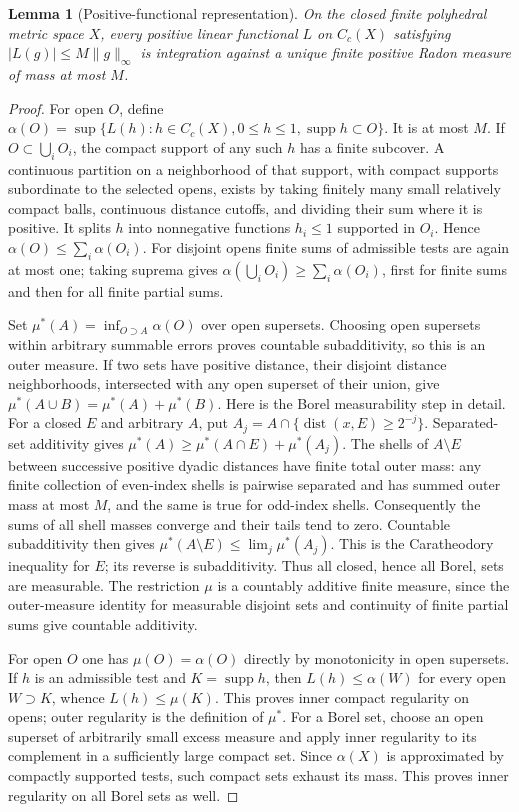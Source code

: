 \documentclass[11pt]{article}
\newtheorem{lemma}[theorem]{Lemma}
\begin{document}
\begin{lemma}[Positive-functional representation]\label{radon-lemma}
On the closed finite polyhedral metric space $X$, every positive linear
functional $L$ on $C_c(X)$ satisfying $|L(g)|\leq M\|g\|_\infty$ is
integration against a unique finite positive Radon measure of mass at
most $M$.
\end{lemma}
\begin{proof}
For open $O$, define
$\alpha(O)=\sup\{L(h):h\in C_c(X),0\leq h\leq1,
\operatorname{supp}h\subset O\}$.
It is at most $M$. If $O\subset\bigcup_iO_i$, the compact support of
any such $h$ has a finite subcover. A continuous partition on a neighborhood
of that support, with compact supports subordinate to the selected opens,
exists by taking finitely many small relatively compact balls, continuous
distance cutoffs, and dividing their sum where it is positive. It splits
$h$ into nonnegative functions $h_i\leq1$ supported in $O_i$.
Hence $\alpha(O)\leq\sum_i\alpha(O_i)$. For disjoint opens finite
sums of admissible tests are again at most one; taking suprema gives
$\alpha(\bigcup_iO_i)\geq\sum_i\alpha(O_i)$, first for finite sums
and then for all finite partial sums.

Set $\mu^*(A)=\inf_{O\supset A}\alpha(O)$ over open supersets.
Choosing open supersets within arbitrary summable errors proves countable
subadditivity, so this is an outer measure. If two sets have positive
distance, their disjoint distance neighborhoods, intersected with any
open superset of their union, give
$\mu^*(A\cup B)=\mu^*(A)+\mu^*(B)$.
Here is the Borel measurability step in detail. For a closed $E$ and
arbitrary $A$, put $A_j=A\cap\{\operatorname{dist}(x,E)\geq2^{-j}\}$.
Separated-set additivity gives
$\mu^*(A)\geq\mu^*(A\cap E)+\mu^*(A_j)$.
The shells of $A\setminus E$ between successive positive dyadic distances
have finite total outer mass: any finite collection of even-index shells
is pairwise separated and has summed outer mass at most $M$, and the
same is true for odd-index shells. Consequently the sums of all shell
masses converge and their tails tend to zero. Countable subadditivity
then gives
$\mu^*(A\setminus E)\leq\lim_j\mu^*(A_j)$.
This is the Caratheodory inequality for $E$; its reverse is subadditivity.
Thus all closed, hence all Borel, sets are measurable. The restriction
$\mu$ is a countably additive finite measure, since the outer-measure
identity for measurable disjoint sets and continuity of finite partial
sums give countable additivity.

For open $O$ one has $\mu(O)=\alpha(O)$ directly by monotonicity in
open supersets. If $h$ is an admissible test and $K=\operatorname{supp}h$,
then $L(h)\leq\alpha(W)$ for every open $W\supset K$, whence
$L(h)\leq\mu(K)$. This proves inner compact regularity on opens;
outer regularity is the definition of $\mu^*$. For a Borel set, choose
an open superset of arbitrarily small excess measure and apply inner
regularity to its complement in a sufficiently large compact set.
Since $\alpha(X)$ is approximated by compactly supported tests, such
compact sets exhaust its mass. This proves inner regularity on all
Borel sets as well.


\end{proof}
\end{document}
